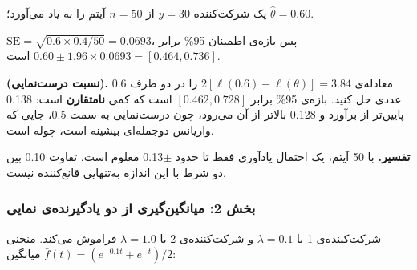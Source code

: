 یک شرکت‌کننده \(y = 30\) از \(n = 50\) آیتم را به یاد می‌آورد؛
\(\hat\theta = 0.60\).

\textbf{}
\(\mathrm{SE} = \sqrt{0.6 \times 0.4 / 50} = 0.0693\)، پس بازه‌ی اطمینان
95\% برابر \(0.60 \pm 1.96 \times 0.0693 = [0.464,\allowbreak 0.736]\) است.

\textbf{ (نسبت درست‌نمایی).} معادله‌ی
\(2[\ell(0.6) - \ell(\theta)] = 3.84\) را در دو طرف 0.6 عددی حل کنید.
بازه‌ی 95\% برابر \([0.462, 0.728]\) است که کمی \textbf{نامتقارن} است:
0.138 پایین‌تر از برآورد و 0.128 بالاتر از آن می‌رود، چون درست‌نمایی به سمت
0.5، جایی که واریانس دوجمله‌ای بیشینه است، چوله است.

\textbf{تفسیر.} با 50 آیتم، یک احتمال یادآوری فقط تا حدود \ensuremath{\pm}0.13 معلوم
است. تفاوت 0.10 بین دو شرط با این اندازه به‌تنهایی قانع‌کننده نیست.

\subsubsection{بخش 2: میانگین‌گیری از دو یادگیرنده‌ی نمایی}

شرکت‌کننده‌ی 1 با \(\lambda = 0.1\) و شرکت‌کننده‌ی 2 با \(\lambda = 1.0\)
فراموش می‌کند. منحنی میانگین \(\bar f(t) = (e^{-0.1t} + e^{-t})/2\):

